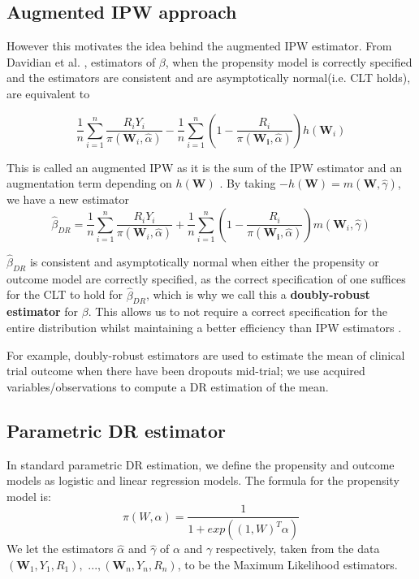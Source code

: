 \documentclass[12pt,twoside]{article}
\begin{document}
\subsection{Augmented IPW approach} 

However this motivates the idea behind the augmented IPW estimator. From Davidian et al. \cite{davidian}, estimators of $\beta$, when the propensity model is correctly specified and the estimators are consistent and are asymptotically normal(i.e. CLT holds), are equivalent to 

\begin{equation}
    \frac{1}{n}\sum_{i=1}^{n}\frac{R_iY_i}{\pi(\mathbf{W}_i, \hat{\alpha})} - \frac{1}{n}\sum_{i=1}^{n} \left(1 - \frac{R_i}{\pi(\mathbf{W_i},\hat{\alpha})} \right) h(\mathbf{W}_i)
\end{equation}

This is called an augmented IPW as it is the sum of the IPW estimator and an augmentation term depending on $h(\mathbf{W})$ \cite{davidian}. By taking $-h(\mathbf{W}) = m(\mathbf{W}, \hat{\gamma})$, we have a new estimator
\begin{equation}
    \hat\beta_{DR} = \frac{1}{n}\sum_{i=1}^{n}\frac{R_iY_i}{\pi(\mathbf{W}_i, \hat{\alpha})} + \frac{1}{n}\sum_{i=1}^{n} \left(1 - \frac{R_i}{\pi(\mathbf{W_i},\hat{\alpha})} \right) m(\mathbf{W}_i, \hat\gamma)
\end{equation}

$\hat\beta_{DR}$ is consistent and asymptotically normal when either the propensity or outcome model are correctly specified, as the correct specification of one suffices for the CLT to hold for $\hat\beta_{DR}$, which is why we call this a \textbf{doubly-robust estimator} for $\beta$. This allows us to not require a correct specification for the entire distribution whilst maintaining a better efficiency than IPW estimators \cite{vansteelandt}.

For example, doubly-robust estimators are used to estimate the mean of clinical trial outcome when there have been dropouts mid-trial; we use acquired variables/observations to compute a DR estimation of the mean. \\

\subsection{Parametric DR estimator}

In standard parametric DR estimation, we define the propensity and outcome models as logistic and linear regression models. The formula for the propensity model is:
\begin{equation*}
    \pi(W,\alpha) = \frac{1}{1+exp((1,W)^T\alpha)} 
\end{equation*}
We let the estimators $\hat{\alpha}$ and $\hat\gamma$ of $\alpha$ and $\gamma$ respectively, taken from the data $(\mathbf{W}_1, Y_1, R_1),$ $...,(\mathbf{W}_n, Y_n, R_n)$, to be the Maximum Likelihood estimators. \\
\end{document}
